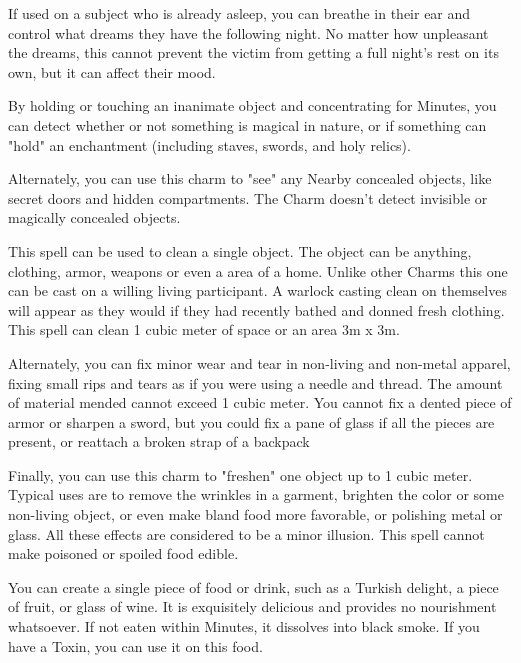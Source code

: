 {  If used on a subject who is already asleep, you can breathe in their ear and control what dreams they have the following night. No matter how unpleasant the dreams, this cannot prevent the victim from getting a full night’s rest on its own, but it can affect their mood.


  By holding or touching an inanimate object and concentrating for Minutes, you can detect whether or not something is magical in nature, or if something can "hold" an enchantment (including staves, swords, and holy relics).  

  Alternately, you can use this charm to "see" any Nearby concealed objects, like secret doors and hidden compartments.  The Charm doesn't detect invisible or magically concealed objects. 



  This spell can be used to clean a single object. The object can be anything, clothing, armor, weapons or even a area of a home. Unlike other Charms this one can be cast on a willing living participant. A warlock casting clean on themselves will appear as they would if they had recently bathed and donned fresh clothing. This spell can clean 1 cubic meter of space or an area 3m x 3m. 

  Alternately, you can fix minor wear and tear in non-living and non-metal apparel, fixing small rips and tears as if you were using a needle and thread.  The amount of material mended cannot exceed 1 cubic meter.  You cannot fix a dented piece of armor or sharpen a sword, but you could fix a pane of glass if all the pieces are present, or reattach a broken strap of a backpack

  Finally, you can use this charm to "freshen" one object up to 1 cubic meter. Typical uses are to remove the wrinkles in a garment, brighten the color or some non-living object, or even make bland food more favorable, or polishing metal or glass. All these effects are considered to be a minor illusion. This spell cannot make poisoned or spoiled food edible. 


  You can create a single piece of food or drink, such as a Turkish delight, a piece of fruit, or glass of wine. It is exquisitely delicious and provides no nourishment whatsoever. If not eaten within Minutes, it dissolves into black smoke.  If you have a Toxin, you can use it on this food.

}
